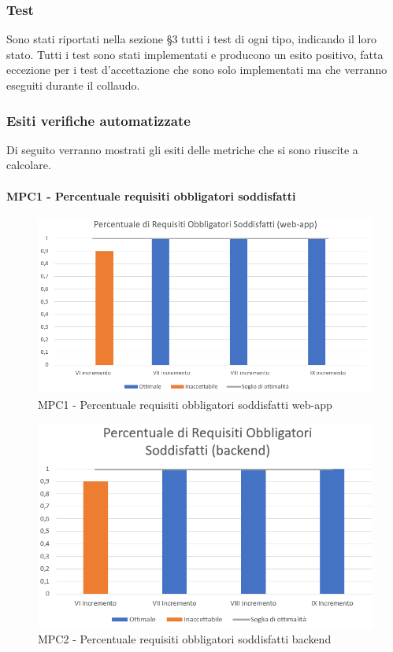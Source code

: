 \subsubsection{Test}
Sono stati riportati nella sezione §3 tutti i test di ogni tipo, indicando il loro stato. Tutti i test sono stati implementati e producono un esito positivo, fatta eccezione per i test d'accettazione che sono solo implementati ma che verranno eseguiti durante il collaudo.
\subsubsection{Esiti verifiche automatizzate}
Di seguito verranno mostrati gli esiti delle metriche che si sono riuscite a calcolare.

\paragraph{MPC1 - Percentuale requisiti obbligatori soddisfatti}
\begin{figure}[h!]
    \centering
      \includegraphics[scale=1]{Immagini/PercReqObbWAA.PNG}
    \caption{MPC1 - Percentuale requisiti obbligatori soddisfatti web-app}
  \end{figure}

\begin{figure}[h!]
    \centering
      \includegraphics[scale=1]{Immagini/PercReqObbBEA.PNG}
    \caption{MPC2 - Percentuale requisiti obbligatori soddisfatti backend}
  \end{figure}

